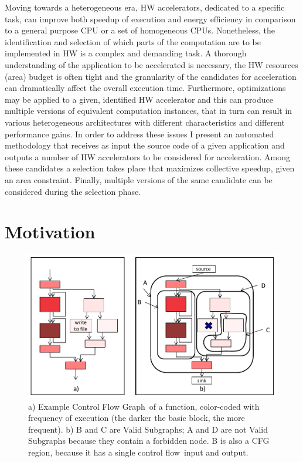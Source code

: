 \documentclass[]{usiinfthesis}
\newcommand{\controlflow}{control flow}
\newcommand{\CFG}{Control Flow Graph}
\begin{document}
Moving towards a heterogeneous era, HW accelerators, dedicated to a specific task, can
improve both speedup of execution and energy efficiency in comparison to a general 
purpose CPU or a set of homogeneous CPUs. 
Nonetheless, the identification and selection 
of which parts of the computation are to be implemented in HW is a complex and demanding task. 
A thorough understanding of the application to be accelerated is necessary, the HW resources
(area) budget is often tight and the granularity of the candidates for acceleration 
can dramatically affect the overall execution time. Furthermore, optimizations may be applied
to a given, identified HW accelerator and this can produce multiple versions of equivalent
computation instances, that in turn can result in various heterogeneous architectures with different
characteristics and different performance gains.
In order to address these issues I present an automated methodology
that receives as input the source code of a given application and outputs a number of 
HW accelerators to be considered for acceleration. Among these candidates a selection takes 
place that maximizes collective speedup, given an area constraint. Finally, 
multiple versions of the same candidate can be considered during the selection phase.

\section{Motivation}
\label{sec:mot}


\begin{figure}[t]
\centering
\includegraphics[width= .7 \linewidth]{Figs/cfg_example}
\caption{a) Example \CFG\ of a function, color-coded with frequency
  of execution (the darker the basic block, the more frequent). b) B
  and C are Valid Subgraphs; A and D are not Valid Subgraphs because
  they contain a forbidden node. B is also a CFG region, because it has a
  single \controlflow\ input and output.}
\label{fig:cfg-example}
\end{figure}
\end{document}
